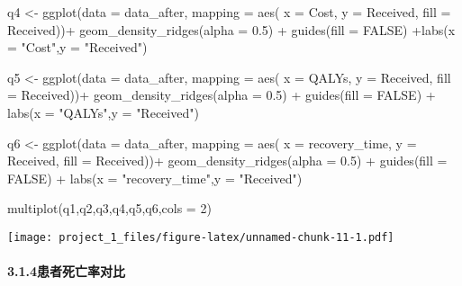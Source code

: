 \documentclass[
]{article}
\newenvironment{Shaded}{\begin{snugshade}}{\end{snugshade}}
\newcommand{\AttributeTok}[1]{\textcolor[rgb]{0.77,0.63,0.00}{#1}}
\newcommand{\ConstantTok}[1]{\textcolor[rgb]{0.00,0.00,0.00}{#1}}
\newcommand{\DecValTok}[1]{\textcolor[rgb]{0.00,0.00,0.81}{#1}}
\newcommand{\FloatTok}[1]{\textcolor[rgb]{0.00,0.00,0.81}{#1}}
\newcommand{\FunctionTok}[1]{\textcolor[rgb]{0.00,0.00,0.00}{#1}}
\newcommand{\NormalTok}[1]{#1}
\newcommand{\OtherTok}[1]{\textcolor[rgb]{0.56,0.35,0.01}{#1}}
\newcommand{\SpecialCharTok}[1]{\textcolor[rgb]{0.00,0.00,0.00}{#1}}
\newcommand{\StringTok}[1]{\textcolor[rgb]{0.31,0.60,0.02}{#1}}
\begin{document}
\begin{Shaded}
\begin{Highlighting}[]
\NormalTok{q4 }\OtherTok{\textless{}{-}} \FunctionTok{ggplot}\NormalTok{(}\AttributeTok{data =}\NormalTok{ data\_after, }\AttributeTok{mapping =} \FunctionTok{aes}\NormalTok{(}
   \AttributeTok{x =}\NormalTok{ Cost, }
   \AttributeTok{y =}\NormalTok{ Received,}
   \AttributeTok{fill =}\NormalTok{ Received))}\SpecialCharTok{+} \FunctionTok{geom\_density\_ridges}\NormalTok{(}\AttributeTok{alpha =} \FloatTok{0.5}\NormalTok{) }\SpecialCharTok{+} \FunctionTok{guides}\NormalTok{(}\AttributeTok{fill =} \ConstantTok{FALSE}\NormalTok{) }\SpecialCharTok{+}\FunctionTok{labs}\NormalTok{(}\AttributeTok{x =} \StringTok{"Cost"}\NormalTok{,}\AttributeTok{y =} \StringTok{"Received"}\NormalTok{)}

\NormalTok{q5 }\OtherTok{\textless{}{-}} \FunctionTok{ggplot}\NormalTok{(}\AttributeTok{data =}\NormalTok{ data\_after, }\AttributeTok{mapping =} \FunctionTok{aes}\NormalTok{(}
   \AttributeTok{x =}\NormalTok{ QALYs, }
   \AttributeTok{y =}\NormalTok{ Received,}
   \AttributeTok{fill =}\NormalTok{ Received))}\SpecialCharTok{+} \FunctionTok{geom\_density\_ridges}\NormalTok{(}\AttributeTok{alpha =} \FloatTok{0.5}\NormalTok{) }\SpecialCharTok{+} \FunctionTok{guides}\NormalTok{(}\AttributeTok{fill =} \ConstantTok{FALSE}\NormalTok{) }\SpecialCharTok{+} \FunctionTok{labs}\NormalTok{(}\AttributeTok{x =} \StringTok{"QALYs"}\NormalTok{,}\AttributeTok{y =} \StringTok{"Received"}\NormalTok{)}

\NormalTok{q6 }\OtherTok{\textless{}{-}} \FunctionTok{ggplot}\NormalTok{(}\AttributeTok{data =}\NormalTok{ data\_after, }\AttributeTok{mapping =} \FunctionTok{aes}\NormalTok{(}
   \AttributeTok{x =}\NormalTok{ recovery\_time, }
   \AttributeTok{y =}\NormalTok{ Received,}
   \AttributeTok{fill =}\NormalTok{ Received))}\SpecialCharTok{+} \FunctionTok{geom\_density\_ridges}\NormalTok{(}\AttributeTok{alpha =} \FloatTok{0.5}\NormalTok{) }\SpecialCharTok{+} \FunctionTok{guides}\NormalTok{(}\AttributeTok{fill =} \ConstantTok{FALSE}\NormalTok{) }\SpecialCharTok{+} \FunctionTok{labs}\NormalTok{(}\AttributeTok{x =} \StringTok{"recovery\_time"}\NormalTok{,}\AttributeTok{y =} \StringTok{"Received"}\NormalTok{)}

\FunctionTok{multiplot}\NormalTok{(q1,q2,q3,q4,q5,q6,}\AttributeTok{cols =} \DecValTok{2}\NormalTok{)}
\end{Highlighting}
\end{Shaded}

\texttt{[image: project\_1\_files/figure-latex/unnamed-chunk-11-1.pdf]}

\hypertarget{ux60a3ux8005ux6b7bux4ea1ux7387ux5bf9ux6bd4}{%
\paragraph{3.1.4患者死亡率对比}\label{ux60a3ux8005ux6b7bux4ea1ux7387ux5bf9ux6bd4}}
\end{document}
